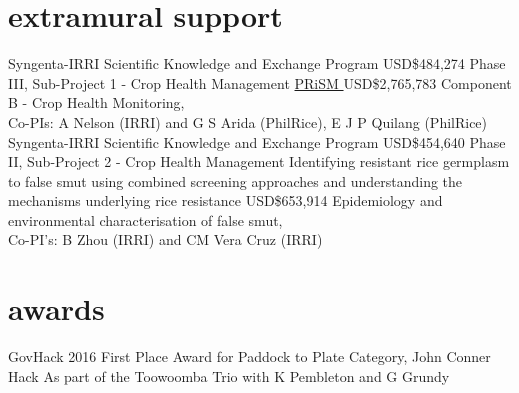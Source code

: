 \section*{extramural support}
  \begin{entrylist}
	 {Syngenta-IRRI Scientific Knowledge and Exchange Program}
	 {USD\$484,274}
	 {Phase III, Sub-Project 1 - Crop Health Management}
	 {\href{http://philippinericeinfo.ph/}{PRiSM }}
	 {USD\$2,765,783}
	 {Component B - Crop Health Monitoring,\\Co-PIs: A Nelson (IRRI) and G S Arida (PhilRice), E J P Quilang (PhilRice)}
	  {Syngenta-IRRI Scientific Knowledge and Exchange Program}
	  {USD\$454,640}
	  {Phase II, Sub-Project 2 - Crop Health Management}
    {Identifying resistant rice germplasm to false smut using combined screening approaches and understanding the mechanisms underlying rice resistance}
    {USD\$653,914}
    {Epidemiology and environmental characterisation of false smut,\\Co-PI's: B Zhou (IRRI) and CM Vera Cruz (IRRI)}
  \end{entrylist}

  \section*{awards}
    \begin{entrylist}
    {GovHack 2016 First Place Award for Paddock to Plate Category, John Conner Hack}
    {}
    {As part of the Toowoomba Trio with K Pembleton and G Grundy}      \end{entrylist}
